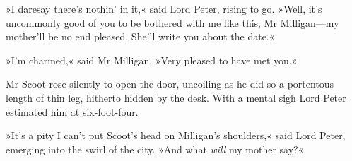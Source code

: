 »I daresay there's nothin' in it,« said Lord Peter, rising to go. »Well, it's uncommonly good of you to be bothered with me like this, Mr Milligan—my mother'll be no end pleased. She'll write you about the date.«

»I'm charmed,« said Mr Milligan. »Very pleased to have met you.«

Mr Scoot rose silently to open the door, uncoiling as he did so a portentous length of thin leg, hitherto hidden by the desk. With a mental sigh Lord Peter estimated him at six-foot-four.

»It's a pity I can't put Scoot's head on Milligan's shoulders,« said Lord Peter, emerging into the swirl of the city. »And what \textit{will} my mother say?«